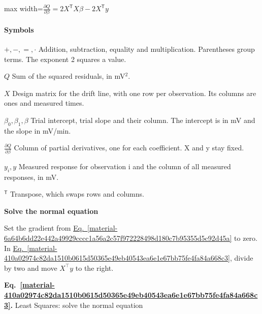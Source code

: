 \documentclass[11pt,a4paper]{article}
\begin{document}
\begin{center}\begin{adjustbox}{max width=\linewidth}$\displaystyle \frac{\partial Q}{\partial\beta}=2X^{\mathsf T}X\beta-2X^{\mathsf T}y$\end{adjustbox}\end{center}

\paragraph{Symbols}
\par\noindent\textbf{\(+,-,=,\cdot\)} Addition, subtraction, equality and multiplication. Parentheses group terms. The exponent 2 squares a value.
\par\noindent\textbf{\(Q\)} Sum of the squared residuals, in mV\ensuremath{{}^2}.
\par\noindent\textbf{\(X\)} Design matrix for the drift line, with one row per observation. Its columns are ones and measured times.
\par\noindent\textbf{\(\beta_0,\beta_1,\beta\)} Trial intercept, trial slope and their column. The intercept is in mV and the slope in mV/min.
\par\noindent\textbf{\(\frac{\partial Q}{\partial\beta}\)} Column of partial derivatives, one for each coefficient. X and y stay fixed.
\par\noindent\textbf{\(y_i,y\)} Measured response for observation i and the column of all measured responses, in mV.
\par\noindent\textbf{\({}^{\mathsf T}\)} Transpose, which swaps rows and columns.
\medskip

\textbf{Solve the normal equation}


Set the gradient from \hyperref[material-6a64b6dd22e442a49929cccc1a56a2c57f972228498d180c7b95355d5c92d45a]{Eq.~\ref*{material-6a64b6dd22e442a49929cccc1a56a2c57f972228498d180c7b95355d5c92d45a}} to zero. In \hyperref[material-410a02974c82da1510b0615d50365e49eb40543ea6e1e67bb75fe4fa84a668c3]{Eq.~\ref*{material-410a02974c82da1510b0615d50365e49eb40543ea6e1e67bb75fe4fa84a668c3}}, divide by two and move \(X^\top y\) to the right.


\par\medskip
{}
\label{material-410a02974c82da1510b0615d50365e49eb40543ea6e1e67bb75fe4fa84a668c3}
\noindent\textbf{Eq.~\ref*{material-410a02974c82da1510b0615d50365e49eb40543ea6e1e67bb75fe4fa84a668c3}.} Least Squares: solve the normal equation\par\nopagebreak
\end{document}
